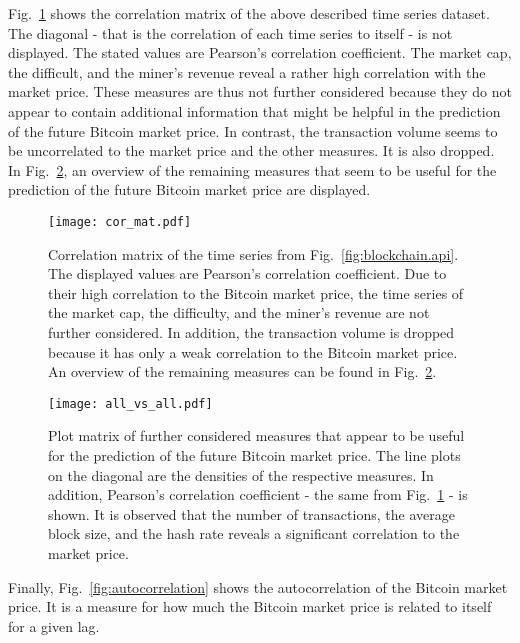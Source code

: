 Fig.~\ref{fig:correlation_matrix} shows the correlation matrix of the above described time series dataset. The diagonal - that is the correlation of each time series to itself - is not displayed. The stated values are Pearson's correlation coefficient. The market cap, the difficult, and the miner's revenue reveal a rather high correlation with the market price. These measures are thus not further considered because they do not appear to contain additional information that might be helpful in the prediction of the future Bitcoin market price. In contrast, the transaction volume seems to be uncorrelated to the market price and the other measures. It is also dropped. \\

In Fig.~\ref{fig:all_vs_all}, an overview of the remaining measures that seem to be useful for the prediction of the future Bitcoin market price are displayed.

\begin{figure}[h!]
  \centering
  \texttt{[image: cor\_mat.pdf]}
  \caption{Correlation matrix of the time series from Fig.~\ref{fig:blockchain.api}. The displayed values are Pearson's correlation coefficient. Due to their high correlation to the Bitcoin market price, the time series of the market cap, the difficulty, and the miner's revenue are not further considered. In addition, the transaction volume is dropped because it has only a weak correlation to the Bitcoin market price. An overview of the remaining measures can be found in Fig.~\ref{fig:all_vs_all}.}
  \label{fig:correlation_matrix}
\end{figure}

\begin{figure}[h!]
	\centering
	\texttt{[image: all\_vs\_all.pdf]}
    \caption{Plot matrix of further considered measures that appear to be useful for the prediction of the future Bitcoin market price. The line plots on the diagonal are the densities of the respective measures. In addition, Pearson's correlation coefficient - the same from Fig.~\ref{fig:correlation_matrix} - is shown. It is observed that the number of transactions, the average block size, and the hash rate reveals a significant correlation to the market price.}
    \label{fig:all_vs_all}
\end{figure}

Finally, Fig.~\ref{fig:autocorrelation} shows the autocorrelation of the Bitcoin market price. It is a measure for how much the Bitcoin market price is related to itself for a given lag. 

